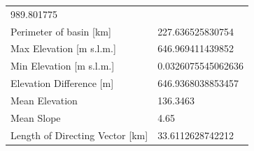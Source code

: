 \documentclass[11pt,]{article}
\begin{document}
\begin{longtable}[]{@{}ll@{}}
\begin{minipage}[t]{0.28\columnwidth}
989.801775\strut
\end{minipage}\tabularnewline
\begin{minipage}[t]{0.66\columnwidth}\raggedright\strut
Perimeter of basin {[}km{]}\strut
\end{minipage} & \begin{minipage}[t]{0.28\columnwidth}\raggedright\strut
227.636525830754\strut
\end{minipage}\tabularnewline
\begin{minipage}[t]{0.66\columnwidth}\raggedright\strut
Max Elevation {[}m s.l.m.{]}\strut
\end{minipage} & \begin{minipage}[t]{0.28\columnwidth}\raggedright\strut
646.969411439852\strut
\end{minipage}\tabularnewline
\begin{minipage}[t]{0.66\columnwidth}\raggedright\strut
Min Elevation {[}m s.l.m.{]}\strut
\end{minipage} & \begin{minipage}[t]{0.28\columnwidth}\raggedright\strut
0.0326075545062636\strut
\end{minipage}\tabularnewline
\begin{minipage}[t]{0.66\columnwidth}\raggedright\strut
Elevation Difference {[}m{]}\strut
\end{minipage} & \begin{minipage}[t]{0.28\columnwidth}\raggedright\strut
646.9368038853457\strut
\end{minipage}\tabularnewline
\begin{minipage}[t]{0.66\columnwidth}\raggedright\strut
Mean Elevation\strut
\end{minipage} & \begin{minipage}[t]{0.28\columnwidth}\raggedright\strut
136.3463\strut
\end{minipage}\tabularnewline
\begin{minipage}[t]{0.66\columnwidth}\raggedright\strut
Mean Slope\strut
\end{minipage} & \begin{minipage}[t]{0.28\columnwidth}\raggedright\strut
4.65\strut
\end{minipage}\tabularnewline
\begin{minipage}[t]{0.66\columnwidth}\raggedright\strut
Length of Directing Vector {[}km{]}\strut
\end{minipage} & \begin{minipage}[t]{0.28\columnwidth}\raggedright\strut
33.6112628742212\strut

\end{minipage}
\end{longtable}
\end{document}
